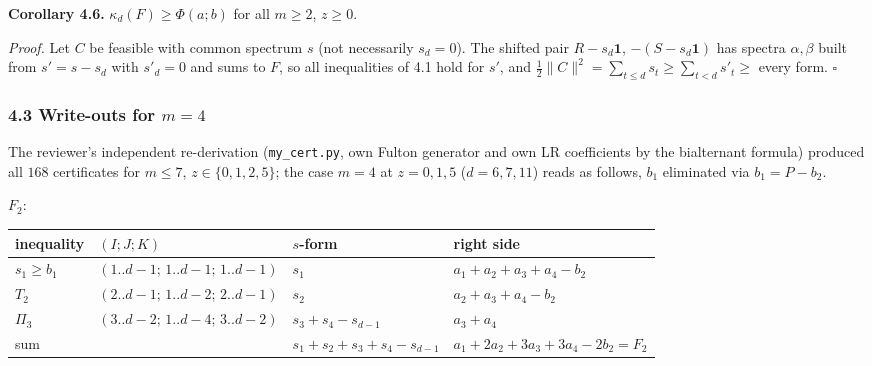 \documentclass[
  11pt,
  a4paper,
]{article}
\newcounter{none} %
\begin{document}
\textbf{Corollary 4.6.} \(\kappa_d(F)\ge\Phi(a;\allowbreak{}b)\) for all \(m\ge2\),
\(z\ge0\).

\emph{Proof.} Let \(C\) be feasible with common spectrum \(s\) (not
necessarily \(s_d=0\)). The shifted pair \(R-s_d\mathbf 1\),
\(-(S-s_d\mathbf 1)\) has spectra \(\alpha,\allowbreak{}\beta\) built from
\(s'=s-s_d\) with \(s'_d=0\) and sums to \(F\), so all inequalities of
4.1 hold for \(s'\), and
\(\tfrac12\|C\|^2=\sum_{t\le d}s_t\ge\sum_{t<d}s'_t\ge\) every form.
\(\square\)

\subsubsection{\texorpdfstring{4.3 Write-outs for
\(m=4\)}{4.3 Write-outs for m=4}}\label{write-outs-for-m4}

The reviewer's independent re-derivation ({\small\texttt{my\_\allowbreak{}cert.\allowbreak{}py}}, own
Fulton generator and own LR coefficients by the bialternant formula)
produced all \(168\) certificates for \(m\le7\), \(z\in\{0,\allowbreak{}1,\allowbreak{}2,\allowbreak{}5\}\);
the case \(m=4\) at \(z=0,\allowbreak{}1,\allowbreak{}5\) (\(d=6,\allowbreak{}7,\allowbreak{}11\)) reads as follows, \(b_1\)
eliminated via \(b_1=P-b_2\).

\(F_2\):

{\def\LTcaptype{none} %
\begin{longtable}[]{@{}
  >{\raggedright\arraybackslash}p{}
  >{\raggedright\arraybackslash}p{}
  >{\raggedright\arraybackslash}p{}
  >{\raggedright\arraybackslash}p{}@{}}
\toprule\noalign{}
\begin{minipage}[b]{\linewidth}\raggedright
inequality
\end{minipage} & \begin{minipage}[b]{\linewidth}\raggedright
\((I;\allowbreak{}J;\allowbreak{}K)\)
\end{minipage} & \begin{minipage}[b]{\linewidth}\raggedright
\(s\)-form
\end{minipage} & \begin{minipage}[b]{\linewidth}\raggedright
right side
\end{minipage} \\
\midrule\noalign{}
\endhead
\bottomrule\noalign{}
\endlastfoot
\(s_1\ge b_1\) & \((1..d{-}1;\allowbreak{}\,\allowbreak{}1..d{-}1;\allowbreak{}\,\allowbreak{}1..d{-}1)\) & \(s_1\) &
\(a_1+a_2+a_3+a_4-b_2\) \\
\(T_2\) & \((2..d{-}1;\allowbreak{}\,\allowbreak{}1..d{-}2;\allowbreak{}\,\allowbreak{}2..d{-}1)\) & \(s_2\) &
\(a_2+a_3+a_4-b_2\) \\
\(\Pi_3\) & \((3..d{-}2;\allowbreak{}\,\allowbreak{}1..d{-}4;\allowbreak{}\,\allowbreak{}3..d{-}2)\) & \(s_3+s_4-s_{d-1}\) &
\(a_3+a_4\) \\
sum & & \(s_1+s_2+s_3+s_4-s_{d-1}\) & \(a_1+2a_2+3a_3+3a_4-2b_2=F_2\) \\
\end{longtable}
}
\end{document}
